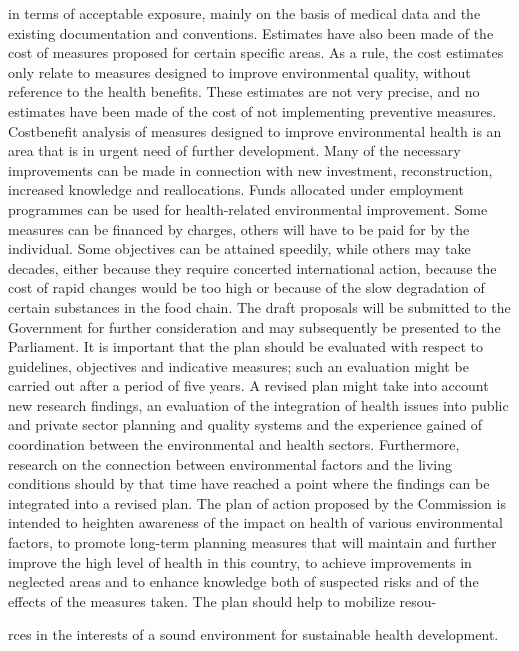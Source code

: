 in terms of acceptable exposure, mainly on the basis of medical data and the existing documentation and conventions.
Estimates have also been made of the cost of measures proposed for certain specific areas. As a rule, the cost estimates only relate to measures designed to improve environmental quality, without reference to the health benefits. These estimates are not very precise, and no estimates have been made of the cost of not implementing preventive measures. Costbenefit analysis of measures designed to improve environmental health is an area that is in urgent need of further development.
Many of the necessary improvements can be made in connection with new investment, reconstruction, increased knowledge and reallocations. Funds allocated under employment programmes can be used for health-related environmental improvement. Some measures can be financed by charges, others will have to be paid for by the individual. Some objectives can be attained speedily, while others may take decades, either because they require concerted international action, because the cost of rapid changes would be too high or because of the slow degradation of certain substances in the food chain.
The draft proposals will be submitted to the Government for further consideration and may subsequently be presented to the Parliament. It is important that the plan should be evaluated with respect to guidelines, objectives and indicative measures; such an evaluation might be carried out after a period of five years. A revised plan might take into account new research findings, an evaluation of the integration of health issues into public and private sector planning and quality systems and the experience gained of coordination between the environmental and health sectors. Furthermore, research on the connection between environmental factors and the living conditions should by that time have reached a point where the findings can be integrated into a revised plan.
The plan of action proposed by the Commission is intended to heighten awareness of the impact on health of various environmental factors, to promote long-term planning measures that will maintain and further improve the high level of health in this country, to achieve improvements in neglected areas and to enhance knowledge both of suspected risks and of the effects of the measures taken. The plan should help to mobilize resou-

rces in the interests of a sound environment for sustainable health development.

